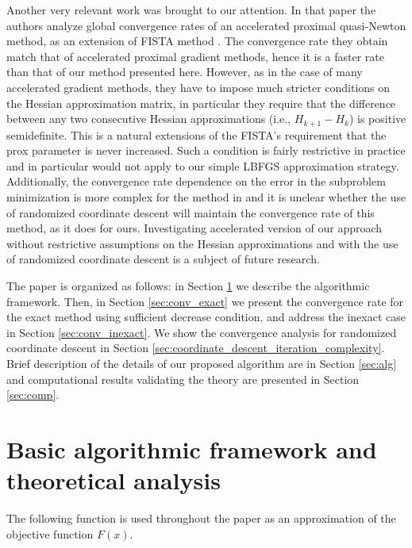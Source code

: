 \documentclass[11pt]{article}
\numberwithin{equation}{section}
\begin{document}
 Another very relevant work \cite{Jiangetal2012} was brought to our attention. In that paper the authors analyze global convergence rates of an accelerated proximal quasi-Newton method, as an extension of FISTA method \cite{Beck2009}. The convergence rate they obtain match that of accelerated proximal gradient methods, hence it is a faster rate
than that of our method presented here. However, as in the case of many accelerated gradient methods,  they have to impose much stricter conditions on the Hessian approximation matrix, in particular they require  that the difference between any two consecutive Hessian approximations (i.e., $H_{k+1}-H_k$) is positive semidefinite. This is a natural extensions of the FISTA's  requirement  that the prox parameter is never increased. Such a condition is fairly restrictive in practice and in particular would not apply to our simple LBFGS approximation strategy. 
 Additionally, the convergence rate dependence on the error in the subproblem minimization is more complex for the method in  \cite{Jiangetal2012} and it is unclear whether the use of randomized coordinate descent will maintain the convergence rate of this method, as it does for ours. Investigating accelerated version of our approach without restrictive assumptions on the Hessian approximations and with the use of randomized coordinate descent is a subject of future research. 
 
 
The paper is organized as follows: in Section \ref{sec:basic}  we describe the  algorithmic framework. Then,  in Section \ref{sec:conv_exact}  we 
present the  convergence rate for the exact method using sufficient decrease condition, and address the inexact case in  Section \ref{sec:conv_inexact}.
We show the convergence analysis for randomized coordinate descent in Section \ref{sec:coordinate_descent_iteration_complexity}. 
Brief description of the details of our  proposed algorithm are in Section \ref{sec:alg} and  computational results  validating the theory are  presented in Section \ref{sec:comp}.







\section{Basic algorithmic framework and theoretical analysis}\label{sec:basic} 

The following function is used throughout the paper as an approximation of the objective function $F(x)$.
\end{document}
